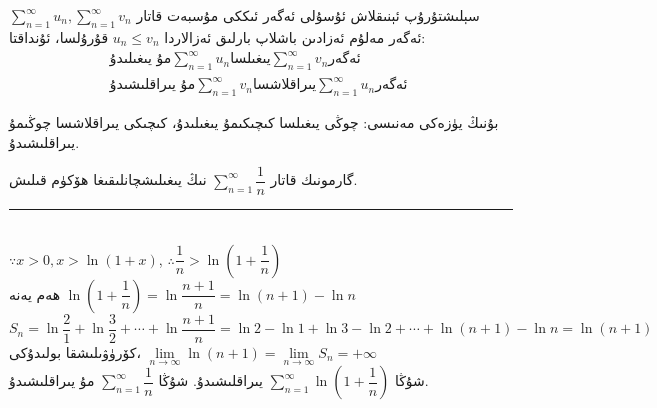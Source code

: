 \begin{MyTheorem}{سېلىشتۇرۇپ ئېنىقلاش ئۇسۇلى}{}%
	ئەگەر ئىككى مۇسبەت قاتار
	$\sum\limits_{n=1}^\infty u_n , \sum\limits_{n=1}^\infty v_n$
	ئەگەر مەلۇم ئەزادىن باشلاپ بارلىق ئەزالاردا
	$u_n \le v_n$
	قۇرۇلسا، ئۇنداقتا:\\
	\begin{align*}
		\text{مۇ يىغىلىدۇ}
		\sum\limits_{n=1}^\infty u_n
		\text{يىغىلسا}
		\sum\limits_{n=1}^\infty v_n
		\text{ئەگەر }\\
		\text{مۇ يىراقلىشىدۇ}
		\sum\limits_{n=1}^\infty v_n
		\text{يىراقلاشسا}
		\sum\limits_{n=1}^\infty u_n
		\text{ئەگەر }
	\end{align*}

\end{MyTheorem}
بۇنىڭ يۈزەكى مەنىسى: چوڭى يىغىلسا كىچىكىمۇ يىغىلىدۇ، كىچىكى يىراقلاشسا چوڭىمۇ يىراقلىشىدۇ.
\begin{myexample}
	گارمونىك قاتار $\sum\limits_{n=1}^\infty\dfrac{1}{n}$ نىڭ يىغىلىشچانلىقىغا ھۆكۈم قىلىش.
	\\\rule{\linewidth}{0.05em}\\
	$\because x>0 , x>\ln(1+x)$,
	$\therefore\dfrac{1}{n}>\ln\left(1+\dfrac{1}{n}\right)$\\
	ھەم يەنە
	$\ln\left(1+\dfrac{1}{n}\right)=\ln\dfrac{n+1}{n}=\ln(n+1)-\ln n$\\
	$S_n=\ln\dfrac{2}{1}+\ln\dfrac{3}{2}+\cdots+\ln\dfrac{n+1}{n}=\ln2-\ln1+\ln3-\ln2+\cdots+\ln(n+1)-\ln n=\ln(n+1)$\\
	كۆرۈۋىلىشقا بولىدۇكى،
	$\lim\limits_{n\to\infty}\ln(n+1)=\lim\limits_{n\to\infty}S_n=+\infty$\\
	شۇڭا
	$\sum\limits_{n=1}^\infty\ln\left(1+\dfrac{1}{n}\right)$
	يىراقلىشىدۇ. شۇڭا
	$\sum\limits_{n=1}^\infty\dfrac{1}{n}$
	مۇ يىراقلىشىدۇ.
\end{myexample}


